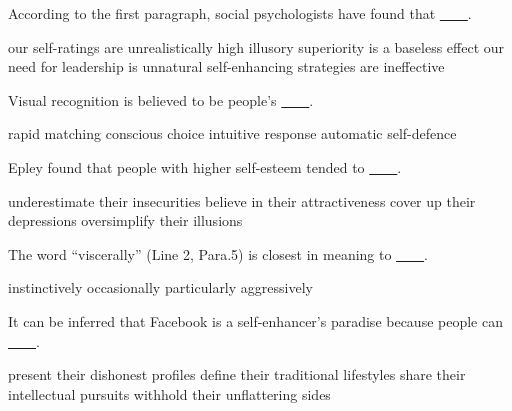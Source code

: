 \item According to the first paragraph, social psychologists have found that \uline{~~~~}.
\begin{tasks}
	\task our self-ratings are unrealistically high
	\task illusory superiority is a baseless effect
	\task our need for leadership is unnatural
	\task self-enhancing strategies are ineffective
\end{tasks}
\item Visual recognition is believed to be people's \uline{~~~~}.
\begin{tasks}
	\task rapid matching
	\task conscious choice
	\task intuitive response
	\task automatic self-defence
\end{tasks}
\item Epley found that people with higher self-esteem tended to \uline{~~~~}.
\begin{tasks}
	\task underestimate their insecurities
	\task believe in their attractiveness
	\task cover up their depressions
	\task oversimplify their illusions
\end{tasks}
\item The word ``viscerally'' (Line 2, Para.5) is closest in meaning to \uline{~~~~}.
\begin{tasks}
	\task instinctively
	\task occasionally
	\task particularly
	\task aggressively
\end{tasks}
\item It can be inferred that Facebook is a self-enhancer's paradise because people can \uline{~~~~}.
\begin{tasks}
	\task present their dishonest profiles
	\task define their traditional lifestyles
	\task share their intellectual pursuits
	\task withhold their unflattering sides
\end{tasks}
